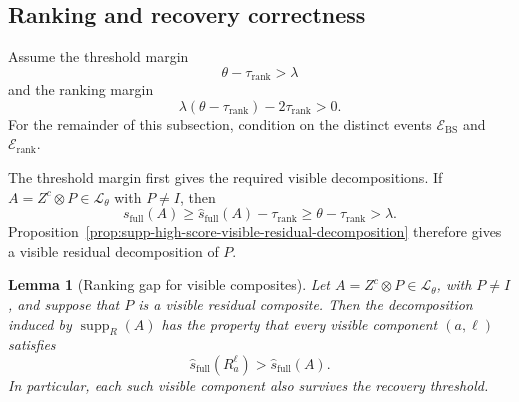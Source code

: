 \documentclass[
  aps,
  prx,
  reprint,
  superscriptaddress,
  amsmath,
  amssymb,
  nofootinbib,
  longbibliography
]{revtex4-2}
\newtheorem{lemma}[theorem]{Lemma}
\newcommand{\supp}{\operatorname{supp}}
\begin{document}
\subsection{Ranking and recovery correctness}

Assume the threshold margin
\begin{equation}
\theta-\tau_{\mathrm{rank}}>\lambda
\label{eq:supp-visible-threshold-condition}
\end{equation}
and the ranking margin
\begin{equation}
\lambda(\theta-\tau_{\mathrm{rank}})
-2\tau_{\mathrm{rank}}>0.
\label{eq:supp-block-ranking-gap-condition}
\end{equation}
For the remainder of this subsection, condition on the distinct events
$\mathcal E_{\mathrm{BS}}$ and $\mathcal E_{\mathrm{rank}}$.

The threshold margin first gives the required visible decompositions.  If
$A=Z^c\otimes P\in\mathcal L_\theta$ with $P\ne I$, then
\begin{equation}
s_{\mathrm{full}}(A)
\ge
\hat s_{\mathrm{full}}(A)-\tau_{\mathrm{rank}}
\ge
\theta-\tau_{\mathrm{rank}}
>
\lambda.
\end{equation}
Proposition~\ref{prop:supp-high-score-visible-residual-decomposition}
therefore gives a visible residual decomposition of $P$.



\begin{lemma}[Ranking gap for visible composites]
\label{lem:supp-visible-composite-ranking-gap}
Let $A=Z^c\otimes P\in\mathcal L_\theta$, with $P\neq I$, and suppose
that $P$ is a visible residual composite.  Then the decomposition induced
by $\supp_R(A)$ has the property that every visible component $(a,\ell)$
satisfies
\begin{equation}
\hat s_{\mathrm{full}}(R_a^\ell)>\hat s_{\mathrm{full}}(A).
\label{eq:supp-block-proof-empirical-gap}
\end{equation}
In particular, each such visible component also survives the recovery
threshold.
\end{lemma}
\end{document}
